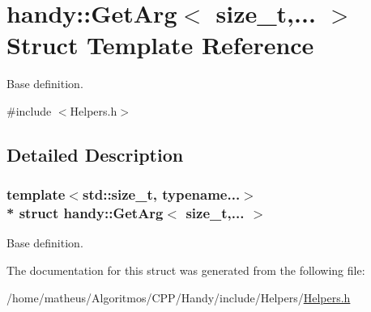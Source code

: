 \hypertarget{structhandy_1_1GetArg}{}\section{handy\+:\+:Get\+Arg$<$ size\+\_\+t,... $>$ Struct Template Reference}
\label{structhandy_1_1GetArg}


Base definition.  




{\ttfamily \#include $<$Helpers.\+h$>$}



\subsection{Detailed Description}
\subsubsection*{template$<$std\+::size\+\_\+t, typename...$>$\\*
struct handy\+::\+Get\+Arg$<$ size\+\_\+t,... $>$}

Base definition. 

The documentation for this struct was generated from the following file\+:\begin{DoxyCompactItemize}
\item 
/home/matheus/\+Algoritmos/\+C\+P\+P/\+Handy/include/\+Helpers/\hyperlink{Helpers_2Helpers_8h}{Helpers.\+h}\end{DoxyCompactItemize}
